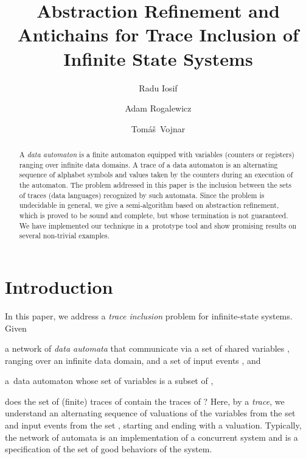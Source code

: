 \documentclass{llncs}
\begin{document}
\title{Abstraction Refinement and Antichains for Trace Inclusion of Infinite
State Systems}

\author{Radu Iosif \and Adam Rogalewicz \and Tom\'{a}\v{s}~Vojnar}
  

\maketitle

\begin{abstract}A \emph{data automaton} is a finite automaton
equipped with variables (counters or registers) ranging over infinite data
domains. A trace of a data automaton is an alternating sequence of alphabet
symbols and values taken by the counters during an execution of the automaton.
The problem addressed in this paper is the inclusion between the sets of traces
(data languages) recognized by such automata. Since the problem is undecidable
in general, we give a semi-algorithm based on abstraction refinement, which is
proved to be sound and complete, but whose termination is not guaranteed. We
have implemented our technique in a~prototype tool and show promising results on
several non-trivial examples.\end{abstract}

\section{Introduction}



In this paper, we address a \emph{trace inclusion} problem for
infinite-state systems. Given \begin{inparaenum}[(i)]
\item a network of \emph{data automata}
     that communicate via a set of
    shared variables , ranging over an infinite
    data domain, and a set of input events , and
\item a~data automaton  whose set of variables  is a
    subset of ,
\end{inparaenum} does the set of (finite) traces of  contain the traces of
? Here, by a \emph{trace}, we understand an alternating sequence of
valuations of the variables from the set  and input events
from the set , starting and ending
with a valuation. 
Typically, the network of automata  is an implementation
of a concurrent system and  is a specification of the set of good
behaviors of the system.
\end{document}
